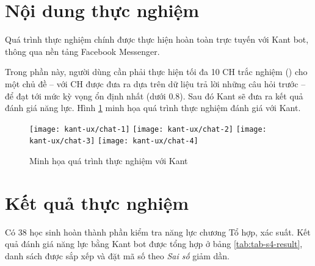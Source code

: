 \section{Nội dung thực nghiệm}
Quá trình thực nghiệm chính được thực hiện hoàn toàn trực tuyến với Kant bot, thông qua nền tảng Facebook Messenger.\par
Trong phần này, người dùng cần phải thực hiện tối đa 10 CH trắc nghiệm (\cite{le2015xay}) cho một chủ đề – với CH được đưa ra dựa trên dữ liệu trả lời những câu hỏi trước – để đạt tới mức kỳ vọng ổn định nhất (dưới $0.8$). Sau đó Kant sẽ đưa ra kết quả đánh giá năng lực. Hình \ref{fig:fig-c4-chatbot-demo} minh họa quá trình thực nghiệm đánh giá với Kant.
\begin{figure}[htb!]\centering
	\texttt{[image: kant-ux/chat-1]}
	\texttt{[image: kant-ux/chat-2]}
	\texttt{[image: kant-ux/chat-3]}
	\texttt{[image: kant-ux/chat-4]}
	\caption{Minh họa quá trình thực nghiệm với Kant}
	\label{fig:fig-c4-chatbot-demo}
\end{figure}\par

\section{Kết quả thực nghiệm}

Có 38 học sinh hoàn thành phần kiểm tra năng lực chương Tổ hợp, xác suất. Kết quả đánh giá năng lực bằng Kant bot được tổng hợp ở bảng \ref{tab:tab-s4-result}, danh sách được sắp xếp và đặt mã số theo \textit{Sai số} giảm dần.

